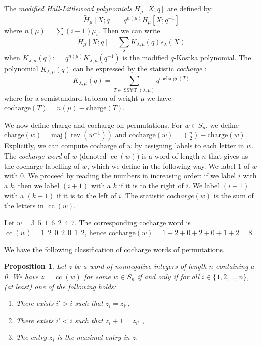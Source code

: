 \documentclass[10pt]{amsart}
\theoremstyle{plain}
\theoremstyle{definition}
\theoremstyle{plain}
\theoremstyle{plain}
\newtheorem{prop}[prop]{Proposition}
\theoremstyle{remark}
\theoremstyle{plain}
\theoremstyle{plain}
\DeclareMathOperator{\ssyt}{SSYT}
\DeclareMathOperator{\rev}{rev}
\DeclareMathOperator{\cc}{cc}
\newcommand{\mHL}{\tilde{H}}
\begin{document}
The \textit{modified Hall-Littlewood polynomials} $\mHL_\mu [X;q]$ are defined by:
\[\mHL_\mu [X;q] = q^{n(\mu)} H_\mu[X;q^{-1}]\]
where $n(\mu) = \sum (i-1)\mu_i$.
Then we can write
\[ \tilde{H}_{\mu}[X;q] = \sum\limits_{\lambda}  \tilde{K}_{\lambda,\mu}(q) s_\lambda(X)\] when $\tilde{K}_{\lambda,\mu}(q): = q^{n(\mu)} K_{\lambda,\mu}(q^{-1})$ is the modified $q$-Kostka polynomial.
The polynomial $\tilde{K}_{\lambda,\mu}(q)$ can be expressed by the statistic \textit{cocharge} :\[\tilde{K}_{\lambda,\mu}(q) = \sum\limits_{T\in \ssyt(\lambda,\mu)}  q^{\text{cocharge}(T)}\]
where for a semistandard tableau of weight $\mu$ we have $\text{cocharge}(T) = n(\mu) - \text{charge}(T).$

We now define charge and cocharge on permutations.
For $w\in S_n$, we define $\text{charge}(w) = \text{maj}(\rev(w^{-1}))$ and $\text{cocharge}(w) = \binom{n}{2} - \text{charge}(w).$
Explicitly, we can compute $\text{cocharge}$ of $w$ by assigning labels to each letter in $w$.
The \textit{cocharge word} of $w$ (denoted $\cc(w)$) is a word of length $n$ that gives us the cocharge labelling of $w$, which we define in the following way. 
We label $1$ of $w$ with 0. We proceed by reading the numbers in increasing order: if we label $i$ with a $k$, then we label $(i+1)$ with a $k$ if it is to the right of $i$. We label $(i+1)$ with a $(k+1)$ if it is to the left of $i$.
The statistic $\textit{cocharge}(w)$  is the sum of the letters in $\cc(w)$. 

\begin{ex}\label{ex: cocharge word}
 Let $w = 3 \ \ 5 \ \ 1 \ \ 6\ \ 2 \ \ 4 \ \ 7 .$  
The corresponding cocharge word is $\cc(w)  = 1  \ \ 2 \ \ 0 \ \ 2 \ \ 0 \ \ 1 \ \ 2$, hence $\text{cocharge}(w) = 1 + 2 + 0 + 2 + 0 + 1 + 2 = 8.$
\end{ex}

We have the following classification of cocharge words of permutations.

\begin{prop}\label{prop: classification of cocharge words}
        Let $z$ be a word of nonnegative integers of length $n$ containing a 0.
        We have $z = \cc(w)$ for some $w\in S_n$ if and only if for all $i\in \{1,2,\dots,  n\}$, (at least) one of the following holds:
    \begin{enumerate}
        \item There exists $i'>i $ such that  $z_i =  z_{i'}$,
        \item There exists $i'<i $ such that  $z_i  + 1=  z_{i'}$ ,
         \item The entry $z_i$ is the maximal entry in $z$.
    \end{enumerate}

\end{prop}
\end{document}
